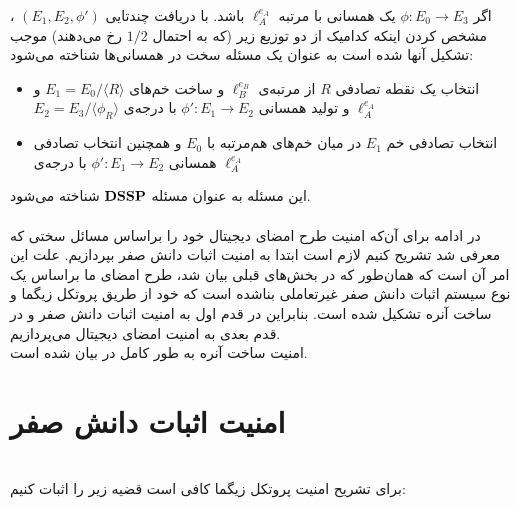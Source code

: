 اگر
$\phi : E_0 \rightarrow E_3$
یک همسانی با مرتبه 
$\ell_A^{e_A}$
باشد. با دریافت چندتایی
$(E_1 , E_2 , {\phi}' )$
، مشخص کردن اینکه کدامیک از دو توزیع زیر (که به احتمال 
$1/2$
رخ می‌دهند) موجب تشکیل آنها شده است به عنوان یک مسئله سخت در همسانی‌ها شناخته می‌شود:
 \begin{itemize}
 	
\item {
 انتخاب یک نقطه تصادفی
 $R$
 از مرتبه‌ی
 $\ell_B^{e_B}$
 و ساخت خم‌های
 $E_1 = E_0 / \langle R \rangle $
 و 
 \\
 $E_2 = E_3 / \langle \phi_{R} \rangle $
 و تولید همسانی
 ${\phi}' : E_1 \rightarrow E_2$
 با درجه‌ی
 $\ell_A^{e_A}$	
}
 
 	
\item {
انتخاب تصادفی خم 
$E_1$
در میان خم‌های هم‌مرتبه با 
$E_0$
و همچنین انتخاب تصادفی همسانی
${\phi}' : E_1 \rightarrow E_2 $
با درجه‌ی
$\ell_A^{e_A}$
}
 	
\end{itemize}
این مسئله به عنوان مسئله 
$\bf{DSSP}$
شناخته می‌شود.
\\
\\


در ادامه برای آن‌که امنیت طرح امضای دیجیتال خود را براساس مسائل سختی که معرفی شد تشریح کنیم لازم است ابتدا به امنیت اثبات دانش صفر بپردازیم. علت این امر آن است که همان‌طور که در بخش‌های قبلی بیان شد، طرح امضای ما براساس یک نوع سیستم اثبات دانش صفر غیرتعاملی بناشده است  که خود از طریق پروتکل زیگما و ساخت آنره تشکیل شده است. بنابراین در قدم اول به امنیت اثبات دانش صفر و در قدم بعدی به امنیت امضای دیجیتال می‌پردازیم. 
\\
امنیت  ساخت آنره به طور کامل در
\cite{unruh}
بیان شده است. 

\newpage
\section{\bf امنیت اثبات دانش صفر}\label{zkp_security}
\\
برای تشریح امنیت پروتکل زیگما کافی است قضیه زیر را اثبات کنیم: 
\\

